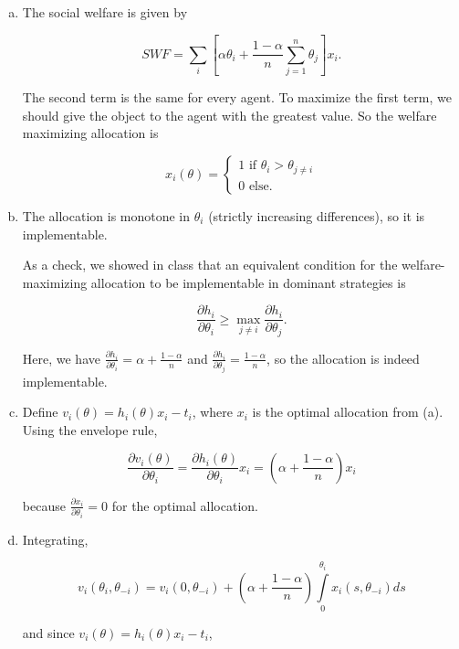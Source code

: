 \documentclass{article}
\begin{document}
\begin{enumerate}[(a)]
	\item

	The social welfare is given by

	$$SWF = \sum_i \left[ \alpha \theta_i + \frac{1-\alpha}{n} \sum_{j = 1}^n \theta_j \right] x_i.$$

	The second term is the same for every agent. To maximize the first term, we should give the object to the agent with the greatest value. So the welfare maximizing allocation is

	$$x_i(\theta) = \begin{cases}
		1 \text{ if } \theta_i > \theta_{j \neq i} \\
		0 \text{ else.}
	\end{cases}$$

	\item

	The allocation is monotone in $\theta_i$ (strictly increasing differences), so it is implementable. 

	As a check, we showed in class that an equivalent condition for the welfare-maximizing allocation to be implementable in dominant strategies is

	$$\frac{\partial h_i}{\partial \theta_i} \geq \max_{j \neq i} \frac{\partial h_i}{\partial \theta_j}.$$

	Here, we have $\frac{\partial h_i}{\partial \theta_i} = \alpha + \frac{1-\alpha}{n}$ and $\frac{\partial h_i}{\partial \theta_j} = \frac{1-\alpha}{n}$, so the allocation is indeed implementable. 

	\item

	Define $v_i(\theta) = h_i(\theta)x_i - t_i$, where $x_i$ is the optimal allocation from (a). Using the envelope rule,

	$$\frac{\partial v_i(\theta)}{\partial \theta_i} = \frac{\partial h_i(\theta)}{\partial \theta_i} x_i = \left( \alpha + \frac{1-\alpha}{n} \right) x_i$$

	because $\frac{\partial x_i}{\partial \theta_i} = 0$ for the optimal allocation.

	\item Integrating,

	$$v_i(\theta_i, \theta_{-i}) = v_i(0, \theta_{-i}) + \left( \alpha + \frac{1-\alpha}{n} \right) \int \limits_0^{\theta_i} x_i(s, \theta_{-i}) ds$$

	and since $v_i(\theta) = h_i(\theta)x_i - t_i$,


\end{enumerate}
\end{document}
